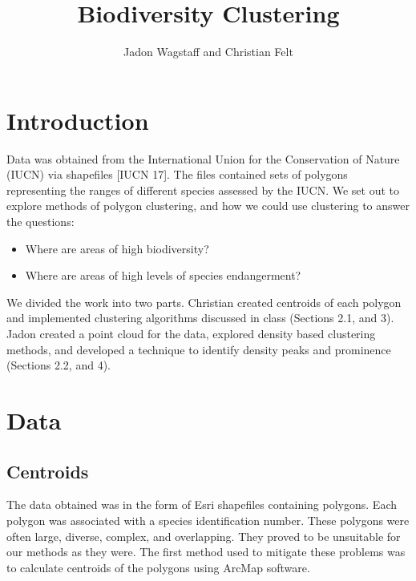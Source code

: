 \documentclass[11pt, fullpage,letterpaper]{article}
\title{Biodiversity Clustering}
\author{Jadon Wagstaff and Christian Felt}
\begin{document}
	\maketitle
	
	\section{Introduction}
		Data was obtained from the International Union for the Conservation of Nature (IUCN) via shapefiles [IUCN 17]. The files contained sets of polygons representing the ranges of different species assessed by the IUCN. We set out to explore methods of polygon clustering, and how we could use clustering to answer the questions:
		\begin{itemize}
			\item Where are areas of high biodiversity?
			\item Where are areas of high levels of species endangerment?
		\end{itemize} 
		We divided the work into two parts. Christian created centroids of each polygon and implemented clustering algorithms discussed in class (Sections 2.1, and 3). Jadon created a point cloud for the data, explored density based clustering methods, and developed a technique to identify density peaks and prominence (Sections 2.2, and 4).
	
	\section{Data}
	\subsection{Centroids}
		The data obtained was in the form of Esri shapefiles containing polygons. Each polygon was associated with a species identification number. These polygons were often large, diverse, complex, and overlapping. They proved to be unsuitable for our methods as they were. The first method used to mitigate these problems was to calculate centroids of the polygons using ArcMap software.
		
\end{document}
